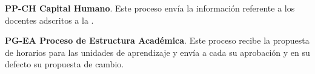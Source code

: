 
\begin{ADescripcion}
	
	\item \textbf{PP-CH Capital Humano}. Este proceso envía la información referente a los docentes adscritos a la .

	\item \textbf{PG-EA Proceso de Estructura Académica}. Este proceso recibe la propuesta de horarios para las unidades de aprendizaje y envía a cada  su aprobación y en su defecto su propuesta de cambio.
	
	
	
	
	
	
\end{ADescripcion}

